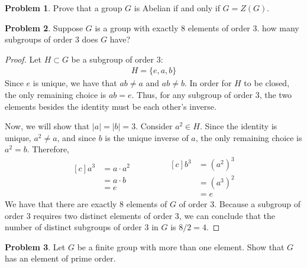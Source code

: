 \documentclass[12pt,reqno]{article}
\theoremstyle{plain}
\theoremstyle{definition}
\newtheorem{problem}{Problem}
\begin{document}

\begin{problem} 
    Prove that a group $G$ is Abelian if and only if $G = Z(G)$.
\end{problem}

\newpage


\begin{problem} 
    Suppose $G$ is a group with exactly 8 elements of order $3$. how many subgroups of order $3$ does $G$ have?
\end{problem}

\begin{proof}
    Let \(H\subset G\) be a subgroup of order 3:
    \begin{align*}
        H = \{e, a, b\}
    \end{align*}
    Since \(e\) is unique, we have that \(ab\neq a\) and \(ab\neq b\). In order for \(H\) to be closed, 
    the only remaining choice is \(ab = e\). Thus, for any subgroup of order \(3\), the two elements besides
    the identity must be each other's inverse.

    Now, we will show that \(|a|=|b|=3\). Consider \(a^2\in H\). Since the identity is unique, \(a^2\neq a\),
    and since \(b\) is the unique inverse of \(a\), the only remaining choice is \(a^2=b\). Therefore,
    \begin{equation*}
        \begin{aligned}[c]
            a^3 &= a \cdot a^2 \\
            &= a \cdot b\\
            &= e
        \end{aligned}
        \qquad\qquad
        \begin{aligned}[c]
            b^3 &= (a^2)^3\\
            &= (a^3)^2\\
            &= e
        \end{aligned}
    \end{equation*}
    We have that there are exactly \(8\) elements of \(G\) of order \(3\). Because a subgroup of order \(3\) 
    requires two distinct elements of order \(3\), we can conclude that the number of distinct subgroups of 
    order \(3\) in \(G\) is \(8 / 2 = 4\).

    

\end{proof}

\newpage


\begin{problem} 
    Let $G$ be a finite group with more than one element. Show that $G$ has an element of prime order.
\end{problem}
\end{document}
